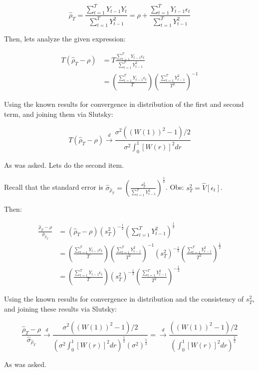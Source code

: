 \documentclass[12pt]{article}
\begin{document}
$$
\hat{\rho}_T = \frac{\sum_{t=1}^{T} Y_{t-1}Y_t}{\sum_{t=1}^{T} Y_{t-1}^2} = \rho + \frac{\sum_{t=1}^{T} Y_{t-1}\epsilon_t}{\sum_{t=1}^{T} Y_{t-1}^2}
$$

Then, lets analyze the given expression:

\begin{align*}
    T (\hat{\rho}_T - \rho) &= T \frac{\sum_{t=1}^{T} Y_{t-1}\epsilon_t}{\sum_{t=1}^{T} Y_{t-1}^2}\\
    &= \left(\frac{\sum_{t=1}^{T} Y_{t-1}\epsilon_t}{T}\right)\left(\frac{\sum_{t=1}^{T} Y_{t-1}^2}{T^2}\right)^{-1}
\end{align*}

Using the known results for convergence in distribution of the first and second term, and joining them via Slutsky:

$$
T (\hat{\rho}_T - \rho) \xrightarrow{d} \frac{\sigma^2((W(1))^2 - 1)/2}{\sigma^2 \int^1_0 [W(r)]^2 dr}
$$

As was asked. Lets do the second item.

Recall that the standard error is $\hat{\sigma}_{\hat{\rho}_T} = \left(\frac{s^2_T}{\sum_{t=1}^{T} Y_{t-1}^2}\right)^{\frac{1}{2}}$. Obs: $s^2_T = \hat{V}[\epsilon_t]$.

Then:

\begin{align*}
    \frac{\hat{\rho}_T - \rho}{\hat{\sigma}_{\hat{\rho}_T}} &= (\hat{\rho}_T - \rho) (s^2_T)^{-\frac{1}{2}}\left(\sum_{t=1}^{T} Y_{t-1}^2\right)^{\frac{1}{2}}\\
    &= \left(\frac{\sum_{t=1}^{T} Y_{t-1}\epsilon_t}{T}\right)\left(\frac{\sum_{t=1}^{T} Y_{t-1}^2}{T^2}\right)^{-1} \left(s^2_T\right)^{-\frac{1}{2}}\left(\frac{\sum_{t=1}^{T} Y_{t-1}^2}{T^2}\right)^{\frac{1}{2}}\\
    &= \left(\frac{\sum_{t=1}^{T} Y_{t-1}\epsilon_t}{T}\right)\left(s^2_T\right)^{-\frac{1}{2}}\left(\frac{\sum_{t=1}^{T} Y_{t-1}^2}{T^2}\right)^{-\frac{1}{2}}
\end{align*}

Using the known results for convergence in distribution and the consistency of $s^2_T$, and joining these results via Slutsky:

$$
\frac{\hat{\rho}_T - \rho}{\hat{\sigma}_{\hat{\rho}_T}} \xrightarrow{d} \frac{\sigma^2((W(1))^2 - 1)/2}{\left(\sigma^2 \int^1_0 [W(r)]^2 dr\right)^\frac{1}{2}(\sigma^2)^\frac{1}{2}} = \xrightarrow{d} \frac{((W(1))^2 - 1)/2}{\left(\int^1_0 [W(r)]^2 dr\right)^\frac{1}{2}}
$$

As was asked.
\end{document}
